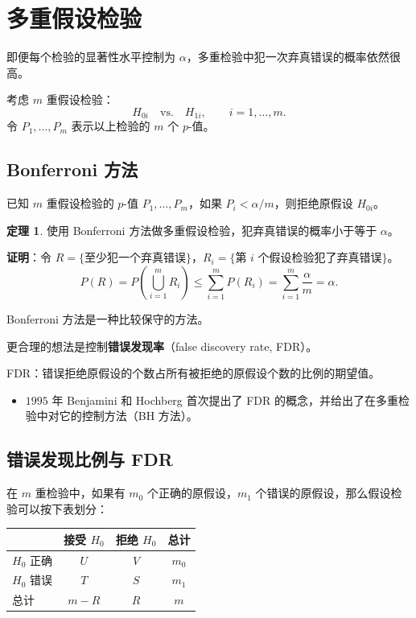 \documentclass[11pt,a4paper]{report}
\theoremstyle{definition}
\newtheorem{theorem}{定理}[chapter]
\begin{document}
\section{多重假设检验}

即便每个检验的显著性水平控制为 $\alpha$，多重检验中犯一次弃真错误的概率依然很高。

考虑 $m$ 重假设检验：
\[
H_{0i}\quad\text{vs.}\quad H_{1i},\qquad i=1,\ldots,m.
\]
令 $P_{1},\ldots,P_{m}$ 表示以上检验的 $m$ 个 $p$-值。

\subsection{Bonferroni 方法}

已知 $m$ 重假设检验的 $p$-值 $P_{1},\ldots,P_{m}$，如果 $P_{i}<\alpha/m$，则拒绝原假设 $H_{0i}$。

\begin{theorem}
使用 Bonferroni 方法做多重假设检验，犯弃真错误的概率小于等于 $\alpha$。
\end{theorem}

\textbf{证明}：令 $R=\{\text{至少犯一个弃真错误}\}$，$R_{i}=\{\text{第 }i\text{ 个假设检验犯了弃真错误}\}$。
\[
P(R)=P\left(\bigcup_{i=1}^{m}R_{i}\right)\leq\sum_{i=1}^{m}P(R_{i})=\sum_{i=1}^{m}\frac{\alpha}{m}=\alpha.
\]

Bonferroni 方法是一种比较保守的方法。

更合理的想法是控制\textbf{错误发现率}（false discovery rate, FDR）。

FDR：错误拒绝原假设的个数占所有被拒绝的原假设个数的比例的期望值。
\begin{itemize}[leftmargin=2em]
    \item $1995$ 年 Benjamini 和 Hochberg 首次提出了 FDR 的概念，并给出了在多重检验中对它的控制方法（BH 方法）。
\end{itemize}

\subsection{错误发现比例与 FDR}

在 $m$ 重检验中，如果有 $m_{0}$ 个正确的原假设，$m_{1}$ 个错误的原假设，那么假设检验可以按下表划分：

\begin{table}[htbp]
\centering
\begin{tabular}{@{}lccc@{}}
\toprule
& \textbf{接受 $H_{0}$} & \textbf{拒绝 $H_{0}$} & \textbf{总计} \\
\midrule
$H_{0}$ 正确 & $U$ & $V$ & $m_{0}$ \\
$H_{0}$ 错误 & $T$ & $S$ & $m_{1}$ \\
总计 & $m-R$ & $R$ & $m$ \\
\bottomrule
\end{tabular}
\end{table}
\end{document}
